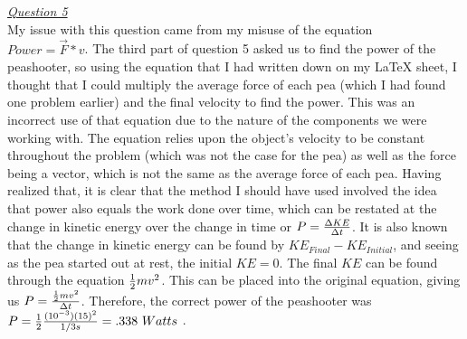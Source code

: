 \documentclass[12pt]{article}
\begin{document}
\\\\
\noindent \underline{\textit{Question 5}}
\\
\indent
	My issue with this question came from my misuse of the equation \\ %
 $Power=\vec{F}*v$. The third part of question 5 asked us to find the power of the peashooter, so using the equation that I had written down on my LaTeX sheet, I thought that I could multiply the average force of each pea (which I had found one problem earlier) and the final velocity to find the power. This was an incorrect use of that equation due to the nature of the components we were working with. The equation relies upon the object's velocity to be constant throughout the problem (which was not the case for the pea) as well as the force being a vector, which is not the same as the average force of each pea. Having realized that, it is clear that the method I should have used involved the idea that power also equals the work done over time, which can be restated at the change in kinetic energy over the change in time or $P={\Delta{KE}\over{\Delta{t}}}$. It is also known that the change in kinetic energy can be found by $KE_{Final}-KE_{Initial}$, and seeing as the pea started out at rest, the initial $KE=0$. The final $KE$ can be found through the equation ${1\over{2}}mv^2$. This can be placed into the original equation, giving us $P={{{1\over{2}}mv^2}\over{\Delta{t}}}$. Therefore, the correct power of the peashooter was $P={{1\over{2}}{{{(10^{-3})}{(15)}^2}\over{{1/3s}}}}=.338 \ Watts$ .
\end{document}
